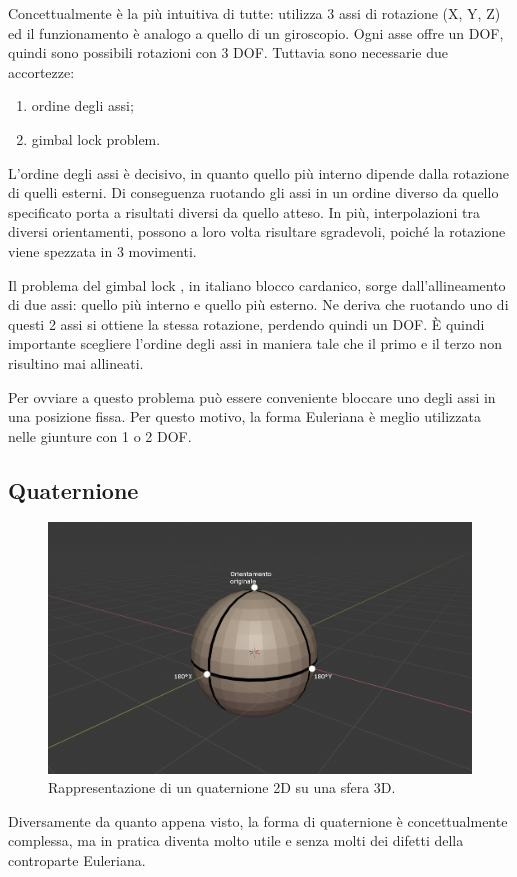 Concettualmente è la più intuitiva di tutte: utilizza 3 assi di rotazione (X, Y, Z) ed il funzionamento è analogo a quello di un giroscopio. Ogni asse offre un DOF, quindi sono possibili rotazioni con 3 DOF. Tuttavia sono necessarie due accortezze: 
\begin{enumerate}
    \item ordine degli assi;
    \item gimbal lock problem.
\end{enumerate}
L'ordine degli assi è decisivo, in quanto quello più interno dipende dalla rotazione di quelli esterni.
Di conseguenza ruotando gli assi in un ordine diverso da quello specificato porta a risultati diversi da quello atteso.
In più, interpolazioni tra diversi orientamenti, possono a loro volta risultare sgradevoli, poiché la rotazione viene spezzata in 3 movimenti.

Il problema del gimbal lock \parencite{anticz16}, in italiano blocco cardanico, sorge dall'allineamento di due assi: quello più interno e quello più esterno.
Ne deriva che ruotando uno di questi 2 assi si ottiene la stessa rotazione, perdendo quindi un DOF.
È quindi importante scegliere l'ordine degli assi in maniera tale che il primo e il terzo non risultino mai allineati.

Per ovviare a questo problema può essere conveniente bloccare uno degli assi in una posizione fissa. Per questo motivo, la forma Euleriana è meglio utilizzata nelle giunture con 1 o 2 DOF.

\newpage
\subsection{Quaternione}
\begin{figure}[ht]
\centering
\includegraphics[width=.8\textwidth]{Figures/3d-sphere}
\decoRule
\caption[Quaternione 2D]{Rappresentazione di un quaternione 2D su una sfera 3D.}
\label{fig:quater}
\end{figure}
Diversamente da quanto appena visto, la forma di quaternione è concettualmente complessa, ma in pratica diventa molto utile e senza molti dei difetti della controparte Euleriana.

